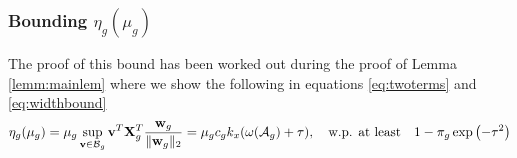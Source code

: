 \subsubsection{Bounding $\eta_g(\mu_g)$}

\begin{IEEEproof}
	The proof of this bound has been worked out during the proof of Lemma \ref{lemm:mainlem} where we show the following in equations \eqref{eq:twoterms} and \eqref{eq:widthbound}
	\[
	\eta_g(\mu_g) = \mu_g \sup_{\v \in \cB_g} \v^T \X_g^T \frac{\w_g}{\norm{\w_g}{2}} = \mu_g c_g k_x (\omega(\cA_g) + \tau), \quad \text{w.p. at least} \quad 1 - \pi_g \exp\left( -\tau^2 \right)
	\]
\end{IEEEproof}

